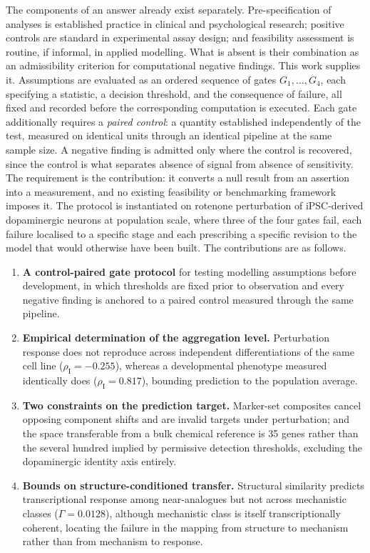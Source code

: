 \documentclass[5p,times,twocolumn]{elsarticle}
\begin{document}
The components of an answer already exist separately. Pre-specification of
analyses is established practice in clinical and psychological research;
positive controls are standard in experimental assay design; and feasibility
assessment is routine, if informal, in applied modelling. What is absent is
their combination as an admissibility criterion for computational negative
findings. This work supplies it. Assumptions are evaluated as an ordered
sequence of gates $G_1,\dots,G_4$, each specifying a statistic, a decision
threshold, and the consequence of failure, all fixed and recorded before the
corresponding computation is executed. Each gate additionally requires a
\emph{paired control}: a quantity established independently of the test,
measured on identical units through an identical pipeline at the same sample
size. A negative finding is admitted only where the control is recovered, since
the control is what separates absence of signal from absence of sensitivity.
The requirement is the contribution: it converts a null result from an assertion
into a measurement, and no existing feasibility or benchmarking framework
imposes it. The protocol is instantiated on rotenone perturbation of
iPSC-derived dopaminergic neurons at population scale, where three of the four
gates fail, each failure localised to a specific stage and each prescribing a
specific revision to the model that would otherwise have been built. The
contributions are as follows.

\begin{enumerate}
\item \textbf{A control-paired gate protocol} for testing modelling
assumptions before development, in which thresholds are fixed prior to
observation and every negative finding is anchored to a paired control measured through the same pipeline.

\item \textbf{Empirical determination of the aggregation level.} Perturbation
response does not reproduce across independent differentiations of the same
cell line ($\rho_\mathrm{I}=-0.255$), whereas a developmental phenotype
measured identically does ($\rho_\mathrm{I}=0.817$), bounding prediction to the
population average.

\item \textbf{Two constraints on the prediction target.} Marker-set composites
cancel opposing component shifts and are invalid targets under perturbation;
and the space transferable from a bulk chemical reference is 35 genes rather
than the several hundred implied by permissive detection thresholds, excluding
the dopaminergic identity axis entirely.

\item \textbf{Bounds on structure-conditioned transfer.} Structural similarity
predicts transcriptional response among near-analogues but not across
mechanistic classes ($\Gamma = 0.0128$), although mechanistic class is itself
transcriptionally coherent, locating the failure in the mapping from structure
to mechanism rather than from mechanism to response.
\end{enumerate}
\end{document}
